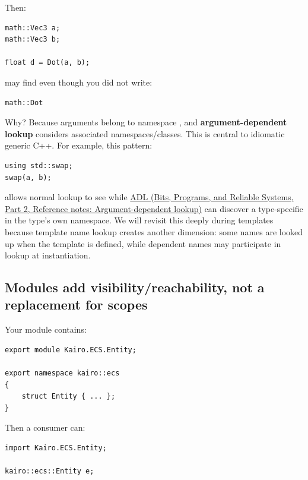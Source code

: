 Then:

\begin{verbatim}
math::Vec3 a;
math::Vec3 b;

float d = Dot(a, b);
\end{verbatim}

may find  even though you did not write:

\begin{verbatim}
math::Dot
\end{verbatim}

Why? Because arguments belong to namespace , and \textbf{argument-dependent lookup} considers associated namespaces/classes. This is central to idiomatic generic C++. For example, this pattern:

\begin{verbatim}
using std::swap;
swap(a, b);
\end{verbatim}

allows normal lookup to see  while \href{../01-Bits-Programs-and-Reliable-Systems-P02/main.pdf\#appendix-7863714aa97f}{ADL (Bits, Programs, and Reliable Systems, Part 2, Reference notes: Argument-dependent lookup)} can discover a type-specific  in the type's own namespace. We will revisit this deeply during templates because template name lookup creates another dimension: some names are looked up when the template is defined, while dependent names may participate in lookup at instantiation.

\subsection{Modules add visibility/reachability, not a replacement for scopes}\label{05-engine-i-ch002-modules-add-visibilityreachability-not-a-replacement-for-scopes}

\hypertarget{05-engine-i-ch002-modules-add-visibilityreachability-not-a-replacement-for-scopes}{}

Your module contains:

\begin{verbatim}
export module Kairo.ECS.Entity;

export namespace kairo::ecs
{
    struct Entity { ... };
}
\end{verbatim}

Then a consumer can:

\begin{verbatim}
import Kairo.ECS.Entity;

kairo::ecs::Entity e;
\end{verbatim}

